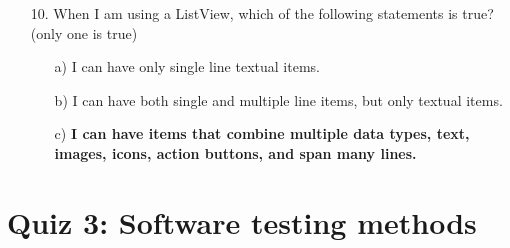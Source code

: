 \documentclass[12pt]{book}
\begin{document}
\begin{itemize}
    \item[10.] When I am using a ListView, which of the following statements is true? (only one is true)
    \begin{itemize}
        \item[a)] I can have only single line textual items.
        \item[b)] I can have both single and multiple line items, but only textual items.
        \item[c)] \textbf{I can have items that combine multiple data types, text, images, icons, action buttons, and span many lines.}
    \end{itemize}

\end{itemize}

\section*{Quiz 3: Software testing methods}
\end{document}
